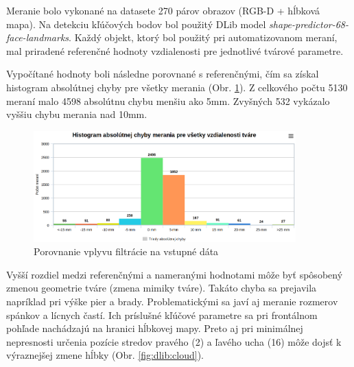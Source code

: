 \vskip 0.2in
Meranie bolo vykonané na datasete 270 párov obrazov (RGB-D + hĺbková mapa). Na detekciu kľúčových bodov bol použitý DLib model \textit{shape-predictor-68-face-landmarks}. Každý objekt, ktorý bol použitý pri automatizovanom meraní, mal priradené referenčné hodnoty vzdialenosti pre jednotlivé tvárové parametre. 


Vypočítané hodnoty boli následne porovnané s referenčnými, čím sa získal histogram absolútnej chyby pre všetky merania (Obr. \ref{fig:histogram}). Z celkového počtu 5130 meraní malo 4598 absolútnu chybu menšiu ako 5mm. Zvyšných 532 vykázalo vyššiu chybu merania nad 10mm. 

\begin{figure}[H]
	\centering
	\includegraphics[width=0.9\textwidth]{figures/plot.png}
	\caption{Porovnanie vplyvu filtrácie na vstupné dáta}
	\label{fig:histogram}
\end{figure}

Vyšší rozdiel medzi referenčnými a nameranými hodnotami môže byť spôsobený zmenou geometrie tváre (zmena mimiky tváre). Takáto chyba sa prejavila napríklad pri výške pier a brady. Problematickými sa javí aj meranie rozmerov spánkov a lícnych častí. Ich príslušné kľúčové parametre sa pri frontálnom pohľade nachádzajú na hranici hĺbkovej mapy. Preto aj pri minimálnej nepresnosti určenia pozície stredov pravého (2) a ľavého ucha (16) môže dojsť k výraznejšej zmene hĺbky (Obr. \ref{fig:dlib:cloud}).

